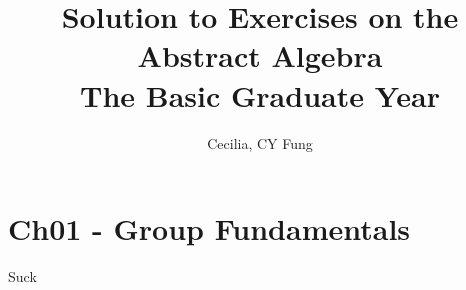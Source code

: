 \documentclass{article}
\title{Solution to Exercises on the \\Abstract Algebra\\The Basic Graduate Year}
\author{Cecilia, CY Fung}
\begin{document}
\maketitle

\section*{Ch01 - Group Fundamentals}
Suck
\end{document}
